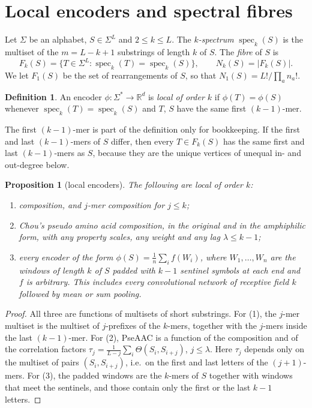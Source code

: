 \documentclass[11pt]{article}
\theoremstyle{plain}
\newtheorem{proposition}[theorem]{Proposition}
\theoremstyle{definition}
\newtheorem{definition}[theorem]{Definition}
\theoremstyle{remark}
\newcommand{\spec}{\operatorname{spec}}
\begin{document}
\section{Local encoders and spectral fibres}\label{sec:fibres}

Let $\Sigma$ be an alphabet, $S\in\Sigma^L$ and $2\le k\le L$. The \emph{$k$-spectrum} $\spec_k(S)$ is the
multiset of the $m=L-k+1$ substrings of length $k$ of $S$. The \emph{fibre} of $S$ is
\[
F_k(S)=\{T\in\Sigma^{L}:\spec_k(T)=\spec_k(S)\},\qquad N_k(S)=|F_k(S)| .
\]
We let $F_1(S)$ be the set of rearrangements of $S$, so that $N_1(S)=L!/\prod_a n_a!$.

\begin{definition}\label{def:local}
An encoder $\phi\colon\Sigma^{*}\to\mathbb R^{d}$ is \emph{local of order $k$} if $\phi(T)=\phi(S)$
whenever $\spec_k(T)=\spec_k(S)$ and $T$, $S$ have the same first $(k-1)$-mer.
\end{definition}

The first $(k-1)$-mer is part of the definition only for bookkeeping. If the first and last
$(k-1)$-mers of $S$ differ, then every $T\in F_k(S)$ has the same first and last $(k-1)$-mers as $S$,
because they are the unique vertices of unequal in- and out-degree below.

\begin{proposition}[local encoders]\label{prop:local}
The following are local of order $k$:
\begin{enumerate}
\item composition, and $j$-mer composition for $j\le k$;
\item Chou's pseudo amino acid composition, in the original and in the amphiphilic form, with any
property scales, any weight and any lag $\lambda\le k-1$;
\item every encoder of the form $\phi(S)=\frac1n\sum_{i}f(W_i)$, where $W_1,\dots,W_n$ are the windows
of length $k$ of $S$ padded with $k-1$ sentinel symbols at each end and $f$ is arbitrary. This includes
every convolutional network of receptive field $k$ followed by mean or sum pooling.
\end{enumerate}
\end{proposition}

\begin{proof}
All three are functions of multisets of short substrings. For (1), the $j$-mer multiset is the multiset
of $j$-prefixes of the $k$-mers, together with the $j$-mers inside the last $(k-1)$-mer. For (2),
PseAAC is a function of the composition and of the correlation factors
$\tau_j=\frac1{L-j}\sum_i\Theta(S_i,S_{i+j})$, $j\le\lambda$. Here $\tau_j$ depends only on the
multiset of pairs $(S_i,S_{i+j})$, i.e.\ on the first and last letters of the $(j+1)$-mers. For (3), the
padded windows are the $k$-mers of $S$ together with windows that meet the sentinels, and those contain
only the first or the last $k-1$ letters.
\end{proof}
\end{document}
